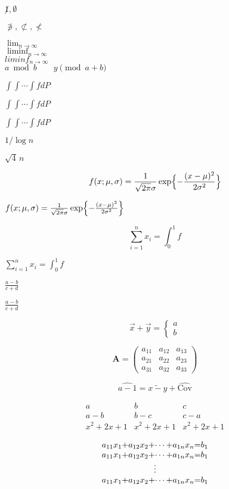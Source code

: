 \documentclass[11pt]{article}
\begin{document}
$\not 1, \emptyset$

$\not\ni, \not\subset, \not<$

$\lim_{n\to\infty}$ \\

$\displaystyle \liminf_{n\longrightarrow \infty}$ \\

$\displaystyle liminf_{n\longrightarrow \infty}$ \\

$a \bmod b \qquad y \pmod{a+b}$

$\int \int \cdots \int f dP$

$\int \! \int \cdots \int f dP$

$\int \!\! \int \cdots \int f dP$

$1/ \! \log n$

$\sqrt{4} \, n$

\[
f(x;\mu,\sigma) = \frac{1}{\sqrt{2\pi}\sigma} \exp\Bigl\{-\frac{(x-\mu)^2}{2\sigma^2} \Bigr\}
\]

$f(x;\mu,\sigma) = \frac{1}{\sqrt{2\pi}\sigma} \exp\Bigl\{-\frac{(x-\mu)^2}{2\sigma^2} \Bigr\}$

$$\sum_{i=1}^n x_i = \int_0^1 f$$

$\sum_{i=1}^n x_i = \int_0^1 f$

$\displaystyle{\frac{a-b}{c+d}}$

$\frac{\displaystyle a-b}{\displaystyle c+d}$

$$\displaystyle \vec{x} + \vec{y} = \left\{\begin{array}{l} a \\ b \end{array}\right.$$

\[
\textbf{A} = \left(\begin{array}{ccc} a_{11}& a_{12}& a_{13}\\
a_{21}& a_{22}& a_{23}\\
a_{31}& a_{32}& a_{33}
\end{array} \right)
\]

$$\widehat{a-1} = \widetilde{x-y} + \widehat{\mbox{Cov}}$$

\[
\begin{array}{lrc}
a & b & c \\
a-b & b-c & c-a \\
x^2+2x+1 & x^2+2x+1 & x^2+2x+1
\end{array}
\]

\begin{equation}
\begin{array}{*{3}{c@{+}}c@{=}c}
a_{11}x_1 & a_{12}x_2 & \cdots & a_{1n}x_n & b_1 \\
a_{11}x_1 & a_{12}x_2 & \cdots & a_{1n}x_n & b_1 \\
\multicolumn{5}{c}{\vdots} \\
a_{11}x_1 & a_{12}x_2 & \cdots & a_{1n}x_n & b_1
\end{array}
\end{equation}
\end{document}
